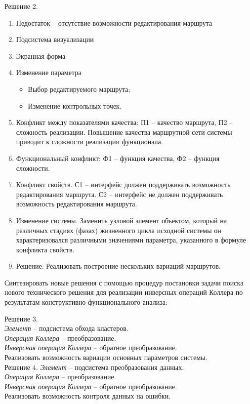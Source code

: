 Решение 2.
\begin{enumerate}
    \item Недостаток -- отсутствие возможности редактирования маршрута
    \item Подсистема визуализации
    \item Экранная форма
    \item Изменение параметра
    \begin{itemize}
        \item Выбор редактируемого маршрута;
        \item Изменение контрольных точек.
    \end{itemize}
    \item Конфликт между показателями качества: П1 -- качество маршрута, 
        П2 -- сложность реализации. Повышение качества маршрутной сети системы приводит к сложности 
        реализации функционала.
    \item Функциональный конфликт: Ф1 -- функция качества, Ф2 -- 
        функция сложности.
    \item Конфликт свойств. С1 -- интерфейс должен поддерживать возможность редактирования маршрута. 
        С2 -- интерфейс не должен поддерживать возможность редактирования маршрута.
    \item Изменение системы. Заменить узловой элемент объектом, который на различных стадиях (фазах) 
        жизненного цикла исходной системы он характеризовался различными значениями параметра, 
        указанного в формуле конфликта свойств.
    \item Решение. Реализовать построение нескольких вариаций маршрутов.
\end{enumerate}

\pagebreak

Синтезировать новые решения с помощью процедур постановки задачи поиска нового технического решения 
для реализации инверсных операций Коллера по результатам конструктивно-функционального анализа:

Решение 3.\\
\emph{Элемент} -- подсистема обхода кластеров.\\
\emph{Операция Коллера} -- преобразование.\\
\emph{Инверсная операция Коллера} -- обратное преобразование.\\
Реализовать возможность вариации основных параметров системы.\\

Решение 4.
\emph{Элемент} -- подсистема преобразования данных.\\
\emph{Операция Коллера} -- преобразование.\\
\emph{Инверсная операция Коллера} -- обратное преобразование.\\
Реализовать возможность контроля данных на ошибки.\\

